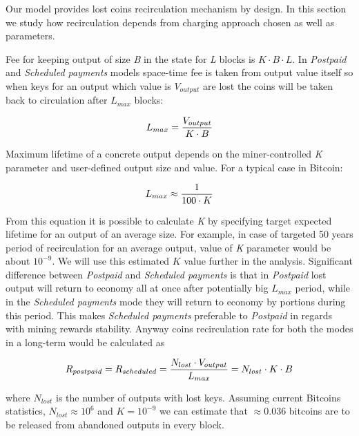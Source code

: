 \documentclass[]{llncs}   %
\newcommand{\state}{state}
\begin{document}
Our model provides lost coins recirculation mechanism by design. In this section we study how recirculation depends from charging approach chosen as well as parameters.

Fee for keeping output of size \textit{B} in the \state{} for \textit{L} blocks is ${K \cdot B \cdot L}$. In \textit{Postpaid} and \textit{Scheduled payments} models space-time fee is taken from output value itself so when keys for an output which value is \textit{$V_{output}$} are lost the coins will be taken back to circulation after \textit{$L_{max}$} blocks: 

\begin{equation}
{L_{max} = {V_{output} \over K \cdot B}}
\end{equation}

Maximum lifetime of a concrete output depends on the miner-controlled \textit{K} parameter and user-defined output size and value. For a typical case in Bitcoin:

\begin{equation}
{L_{max} \approx {1 \over 100 \cdot K}}
\end{equation}

From this equation it is possible to calculate \textit{K} by specifying target expected lifetime for an output of an average size. For example, in case of targeted 50 years period of recirculation for an average output, value of \textit{K} parameter would be about $10^{-9}$. We will use this estimated $K$ value further in the analysis. Significant difference between \textit{Postpaid} and \textit{Scheduled payments} is that in \textit{Postpaid} lost output will return to economy all at once after potentially big $L_{max}$ period, while in the \textit{Scheduled payments} mode they will return to economy by portions during this period. This makes \textit{Scheduled payments} preferable to \textit{Postpaid} in regards with mining rewards stability. Anyway coins recirculation rate for both the modes in a long-term would be calculated as

\begin{equation}
R_{postpaid} = R_{scheduled} = {N_{lost} \cdot V_{output} \over L_{max}} = {N_{lost} \cdot K \cdot B}
\end{equation}

where $N_{lost}$ is the number of outputs with lost keys. Assuming current Bitcoins statistics, $N_{lost}\approx10^6$ and $K = 10^{-9}$ we can estimate that $\approx0.036$ bitcoins are to be released from abandoned outputs in every block.
\end{document}
